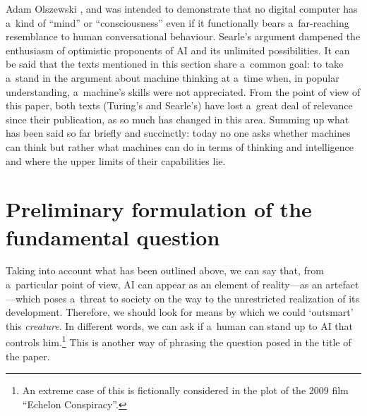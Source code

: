 \begin{artengenv}{Adam Olszewski}
\parencite*[][]{searle_minds_1980}, %
 and was intended to demonstrate that no digital computer has a~kind of ``mind'' or ``consciousness'' even if it functionally bears a~far-reaching resemblance to human conversational behaviour. Searle's argument dampened the enthusiasm of optimistic proponents of AI and its unlimited possibilities. It can be said that the texts mentioned in this section share a~common goal: to take a~stand in the argument about machine thinking at a~time when, in popular understanding, a~machine's skills were not appreciated. From the point of view of this paper, both texts (Turing's and Searle's) have lost a~great deal of relevance since their publication, as so much has changed in this area. Summing up what has been said so far briefly and succinctly: today no one asks whether machines can think but rather what machines can do in terms of thinking and intelligence and where the upper limits of their capabilities lie.

\section{Preliminary formulation of the fundamental question}
Taking into account what has been outlined above, we can say that, from a~particular point of view, AI can appear as an element of reality---as an artefact---which poses a~threat to society on the way to the unrestricted realization of its development. Therefore, we should look for means by which we could ‘outsmart' this \textit{creature}. In different words, we can ask if a~human can stand up to AI that controls him.\footnote{An extreme case of this is fictionally considered in the plot of the 2009 film ``Echelon Conspiracy''.} This is another way of phrasing the question posed in the title of the paper.


\end{artengenv}
